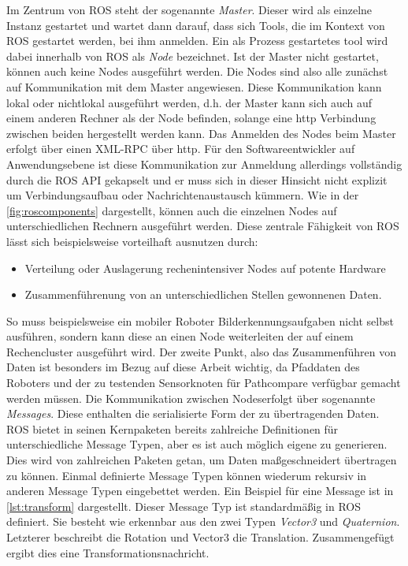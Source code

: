 Im Zentrum von ROS steht der sogenannte \textit{Master}. Dieser wird als
einzelne Instanz gestartet und wartet dann darauf, dass sich Tools, die im
Kontext von ROS gestartet werden, bei ihm anmelden. Ein als Prozess gestartetes
tool wird dabei innerhalb von ROS als \textit{Node} bezeichnet. Ist der
Master nicht gestartet, können auch keine Nodes ausgeführt 
werden. Die Nodes sind also alle zunächst auf Kommunikation mit dem
Master angewiesen. Diese Kommunikation kann lokal oder nichtlokal
ausgeführt werden, d.h. der Master kann sich auch auf einem anderen
Rechner als der Node befinden, solange eine http Verbindung zwischen
beiden hergestellt werden kann. Das Anmelden des Nodes beim
Master erfolgt über einen \gls{XML-RPC} über http. Für den 
Softwareentwickler auf Anwendungsebene ist diese Kommunikation zur Anmeldung
allerdings
vollständig durch die ROS API gekapselt und er muss sich in dieser Hinsicht
nicht explizit um Verbindungsaufbau oder Nachrichtenaustausch kümmern. Wie in
der \autoref{fig:roscomponents} dargestellt, können auch die einzelnen Nodes
auf unterschiedlichen Rechnern ausgeführt werden. Diese zentrale
Fähigkeit von ROS lässt sich beispielsweise vorteilhaft ausnutzen durch:

\begin{itemize}
  \item Verteilung oder Auslagerung rechenintensiver Nodes auf potente Hardware
  \item Zusammenführenung von an unterschiedlichen Stellen gewonnenen Daten.
\end{itemize}

So muss beispielsweise ein mobiler Roboter Bilderkennungsaufgaben nicht selbst
ausführen, sondern kann diese an einen Node weiterleiten der auf einem
Rechencluster ausgeführt wird. Der zweite Punkt, also das Zusammenführen von
Daten ist besonders im Bezug auf diese Arbeit wichtig, da Pfaddaten des
Roboters und der zu testenden Sensorknoten für Pathcompare verfügbar
gemacht werden müssen. Die Kommunikation zwischen Nodeserfolgt über
sogenannte \textit{Messages}. Diese enthalten die serialisierte Form der zu
übertragenden Daten. ROS bietet in seinen Kernpaketen bereits zahlreiche
Definitionen für unterschiedliche Message Typen, aber es ist auch
möglich eigene zu generieren. Dies wird von zahlreichen Paketen getan, um
Daten maßgeschneidert übertragen zu können. Einmal definierte Message
Typen können wiederum rekursiv in anderen Message Typen eingebettet 
werden. Ein Beispiel für eine Message ist in \autoref{lst:transform}
dargestellt. Dieser Message Typ ist standardmäßig in ROS definiert.
Sie besteht wie erkennbar aus den zwei Typen \textit{Vector3} und
\textit{Quaternion}. Letzterer beschreibt die Rotation und Vector3 die
Translation. Zusammengefügt ergibt dies eine Transformationsnachricht.

